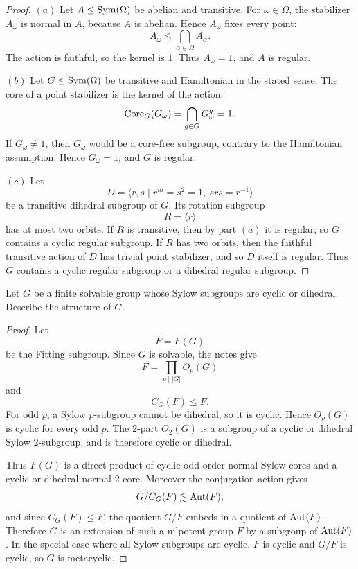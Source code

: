 \begin{proof}
\((a)\) Let \(A\leq \operatorname{Sym}(\Omega)\) be abelian and transitive. For
\(\omega\in\Omega\), the stabilizer \(A_\omega\) is normal in \(A\), because
\(A\) is abelian. Hence \(A_\omega\) fixes every point:
\[
    A_\omega\leq \bigcap_{\alpha\in\Omega}A_\alpha.
\]
The action is faithful, so the kernel is \(1\). Thus \(A_\omega=1\), and \(A\)
is regular.

\((b)\) Let \(G\leq \operatorname{Sym}(\Omega)\) be transitive and Hamiltonian in the stated
sense. The core of a point stabilizer is the kernel of the action:
\[
    \operatorname{Core}_G(G_\omega)=\bigcap_{g\in G}G_\omega^g=1.
\]
If \(G_\omega\neq 1\), then \(G_\omega\) would be a core-free subgroup,
contrary to the Hamiltonian assumption. Hence \(G_\omega=1\), and \(G\) is
regular.

\((c)\) Let
\[
    D=\langle r,s\mid r^m=s^2=1,\ srs=r^{-1}\rangle
\]
be a transitive dihedral subgroup of \(G\). Its rotation subgroup
\[
    R=\langle r\rangle
\]
has at most two orbits. If \(R\) is transitive, then by part \((a)\) it is
regular, so \(G\) contains a cyclic regular subgroup. If \(R\) has two orbits,
then the faithful transitive action of \(D\) has trivial point stabilizer, and
so \(D\) itself is regular. Thus \(G\) contains a cyclic regular subgroup or a
dihedral regular subgroup.
\end{proof}

\begin{exercise}
Let \(G\) be a finite solvable group whose Sylow subgroups are cyclic or
dihedral. Describe the structure of \(G\).
\end{exercise}

\begin{proof}
Let
\[
    F=F(G)
\]
be the Fitting subgroup. Since \(G\) is solvable, the notes give
\[
    F=\prod_{p\mid |G|}O_p(G)
\]
and
\[
    C_G(F)\leq F.
\]
For odd \(p\), a Sylow \(p\)-subgroup cannot be dihedral, so it is cyclic.
Hence \(O_p(G)\) is cyclic for every odd \(p\). The \(2\)-part \(O_2(G)\) is a
subgroup of a cyclic or dihedral Sylow \(2\)-subgroup, and is therefore cyclic
or dihedral.

Thus \(F(G)\) is a direct product of cyclic odd-order normal Sylow cores and a
cyclic or dihedral normal \(2\)-core. Moreover the conjugation action gives
\[
    G/C_G(F)\lesssim \operatorname{Aut}(F),
\]
and since \(C_G(F)\leq F\), the quotient \(G/F\) embeds in a quotient of
\(\operatorname{Aut}(F)\). Therefore \(G\) is an extension of such a nilpotent group \(F\) by
a subgroup of \(\operatorname{Aut}(F)\). In the special case where all Sylow subgroups are
cyclic, \(F\) is cyclic and \(G/F\) is cyclic, so \(G\) is metacyclic.
\end{proof}

